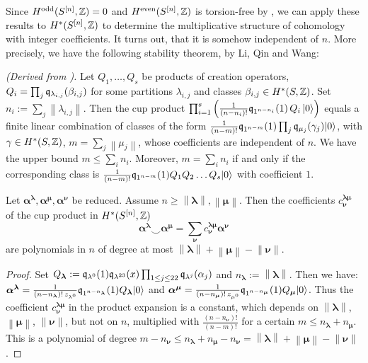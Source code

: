 Since $H^\text{odd}(S^{[n]},\mathbb{Z}) = 0$ and $H^\text{even}(S^{[n]},\mathbb{Z})$ is torsion-free by \cite{Markman}, we can apply these results to $H^\ast(S^{[n]}, \mathbb{Z})$ to determine the multiplicative structure of cohomology with integer coefficients. It turns out, that it is somehow independent of $n$. More precisely, we have the following stability theorem, by Li, Qin and Wang:
\begin{theorem} \label{stability}\emph{(Derived from \cite[Thm.~2.1]{QinWang}).}
Let $Q_1,\ldots,Q_s$ be products of creation operators, \ie $Q_i = \prod_j \mathfrak{q}_{\lambda_{i,j}}(\beta_{i,j}) $ for some partitions $\lambda_{i,j}$ and classes $\beta_{i,j}\in H^\ast(S,\mathbb{Z})$. Set $n_i := \sum_j \left\|\lambda_{i,j}\right\|$.
Then the cup product 
$ \prod_{i=1}^s \left(\frac{1}{(n-n_i)!} \mathfrak{q}_{1^{n-n_i}}(1) \,Q_i \,|0\rangle \right)$ equals a finite linear combination of classes of the form $\frac{1}{(n-m)!}\mathfrak{q}_{1^{n-m}}(1)\prod_j \mathfrak{q}_{\mu_{j}}(\gamma_{j})|0\rangle$, with $\gamma\in H^\ast(S,\mathbb{Z})$, $m=\sum_j\left\|\mu_j\right\|$, whose coefficients are independent of $n$. We have the upper bound $m\leq\sum_i n_i$. Moreover, $m=\sum_i n_i$ if and only if the corresponding class is $\frac{1}{(n-m)!}\mathfrak{q}_{1^{n-m}}(1)Q_1Q_2\ldots Q_s|0\rangle$ with coefficient $1$.
\end{theorem}
\begin{corollary} \label{stabCor} Let $\boldsymbol{\alpha}^{\boldsymbol{\lambda}},\boldsymbol{\alpha}^{\boldsymbol{\mu}},\boldsymbol{\alpha}^{\boldsymbol{\nu}}$ be reduced. Assume $n\geq\left\|\boldsymbol\lambda\right\|,\left\|\boldsymbol\mu\right\| $. Then the coefficients $c^{\boldsymbol{\lambda\mu}}_{\boldsymbol{\nu}}$ of the cup product in $H^\ast(S^{[n]},\mathbb{Z})$
$$\boldsymbol{\alpha}^{\boldsymbol{\lambda}} \smile
\boldsymbol{\alpha}^{\boldsymbol{\mu}}
= \sum_{\boldsymbol{\nu}} c^{\boldsymbol{\lambda\mu}}_{\boldsymbol{\nu}} \boldsymbol{\alpha}^{\boldsymbol{\nu}}
$$  
are polynomials in $n$ of degree at most $ \left\|\boldsymbol\lambda\right\|+\left\|\boldsymbol\mu\right\|-\left\|\boldsymbol\nu\right\|$.
\end{corollary}
\begin{proof} Set $Q_{\boldsymbol{\lambda}}:=  \mathfrak{q}_{\lambda^0}(1)\mathfrak{q}_{\lambda^{23}}(x)\prod_{1\leq j\leq 22}\mathfrak{q}_{\lambda^j}(\alpha_j)$ and $n_{\boldsymbol\lambda}:=\left\|\boldsymbol\lambda\right\|$. Then we have:
$\boldsymbol{\alpha}^{\boldsymbol{\lambda}} = \frac{1}{(n-n_{\boldsymbol\lambda})!\,z_{\lambda^0}}\mathfrak{q}_{1^{n-n_{\boldsymbol\lambda}}}(1)Q_{\boldsymbol\lambda}|0\rangle$ and $
\boldsymbol{\alpha}^{\boldsymbol{\mu}}=\frac{1}{(n-n_{\boldsymbol\mu})!\,z_{\mu^0}}\mathfrak{q}_{1^{n-n_{\boldsymbol\mu}}}(1)Q_{\boldsymbol\mu}|0\rangle $. 
Thus the coefficient $c^{\boldsymbol{\lambda\mu}}_{\boldsymbol{\nu}}$ in the product expansion is a constant, which depends on $ \left\|\boldsymbol\lambda\right\|$, $\left\|\boldsymbol\mu\right\|$, $\left\|\boldsymbol\nu\right\|$, but not on $n$, multiplied with $\frac{(n-n_{\boldsymbol\nu})!}{(n-m)!}$ for a certain $m\leq n_{\boldsymbol\lambda}+n_{\boldsymbol\mu}$. 
This is a polynomial of degree $m-n_{\boldsymbol\nu}\leq n_{\boldsymbol\lambda}+n_{\boldsymbol\mu}-n_{\boldsymbol\nu} =\left\|\boldsymbol\lambda\right\|+\left\|\boldsymbol\mu\right\|-\left\|\boldsymbol\nu\right\| $.
\end{proof}
